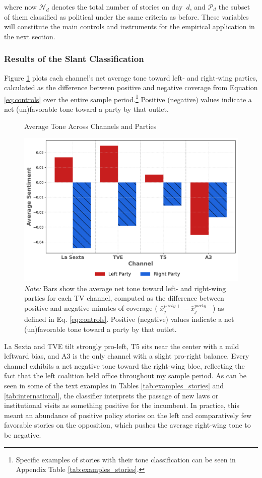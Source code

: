 \documentclass[12pt]{article}
\begin{document}
	where now \(\mathcal{N}_d\) denotes the total number of   stories on day~\(d\), and \(\mathcal{P}_d\) the subset of them classified as political under the same criteria as before. These variables will constitute the main controls and instruments for the empirical application in the next section. 
	

		\subsubsection*{Results of the Slant Classification}
	
	
	
	Figure \ref{fig:chat} plots each channel’s net average tone toward left‐ and right‐wing parties, calculated as the difference between positive and negative coverage from Equation \eqref{eq:controls} over the entire sample period.\footnote{Specific examples of stories with their tone classification can be seen in Appendix Table \ref{tab:examples_stories}.} Positive (negative) values indicate a net (un)favorable tone toward a party by that outlet. 
	
		\begin{figure}[!htbp]
		\caption{Average Tone Across Channels and Parties}
		\centering
		\includegraphics[width=120mm]{figures/chatgpt}
		\caption*{\small \textit{Note:} Bars show the average net tone toward left- and right-wing parties for each TV channel, computed as the difference between positive and negative minutes of coverage ( $	\bar{x}_j^{party+}-\bar{x}_j^{party-}$) as defined in Eq. \eqref{eq:controls}. Positive (negative) values indicate a net (un)favorable tone toward a party by that outlet.}
		\label{fig:chat}
	\end{figure}
	
	La Sexta and TVE tilt strongly pro-left, T5 sits near the center with a mild leftward bias, and A3 is the only channel  with a slight pro-right balance. Every channel exhibits a net negative tone toward the right-wing bloc, reflecting the fact that the left coalition held office throughout my sample period. As can be seen in some of the text examples in Tables \ref{tab:examples_stories} and \ref{tab:international}, the classifier interprets the passage of new laws or institutional visits as something positive for the incumbent. In practice, this meant an abundance of positive policy stories on the left and comparatively few favorable stories on the opposition, which pushes the average right-wing tone to be negative.
	
\end{document}
